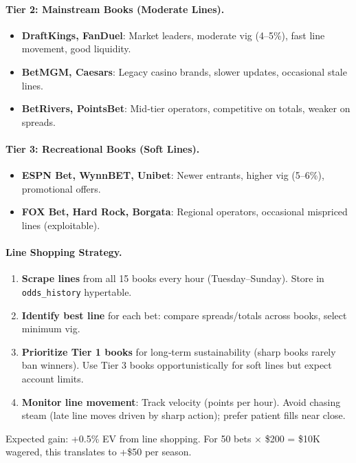 \paragraph{Tier 2: Mainstream Books (Moderate Lines).}
\begin{itemize}
\item \textbf{DraftKings, FanDuel}: Market leaders, moderate vig (4--5\%), fast line movement, good liquidity.
\item \textbf{BetMGM, Caesars}: Legacy casino brands, slower updates, occasional stale lines.
\item \textbf{BetRivers, PointsBet}: Mid‑tier operators, competitive on totals, weaker on spreads.
\end{itemize}

\paragraph{Tier 3: Recreational Books (Soft Lines).}
\begin{itemize}
\item \textbf{ESPN Bet, WynnBET, Unibet}: Newer entrants, higher vig (5--6\%), promotional offers.
\item \textbf{FOX Bet, Hard Rock, Borgata}: Regional operators, occasional mispriced lines (exploitable).
\end{itemize}

\paragraph{Line Shopping Strategy.}
\begin{enumerate}
\item \textbf{Scrape lines} from all 15 books every hour (Tuesday--Sunday). Store in \texttt{odds\_history} hypertable.
\item \textbf{Identify best line} for each bet: compare spreads/totals across books, select minimum vig.
\item \textbf{Prioritize Tier 1 books} for long‑term sustainability (sharp books rarely ban winners). Use Tier 3 books opportunistically for soft lines but expect account limits.
\item \textbf{Monitor line movement}: Track velocity (points per hour). Avoid chasing steam (late line moves driven by sharp action); prefer patient fills near close.
\end{enumerate}

Expected gain: +0.5\% EV from line shopping. For 50 bets × \$200 = \$10K wagered, this translates to +\$50 per season.

